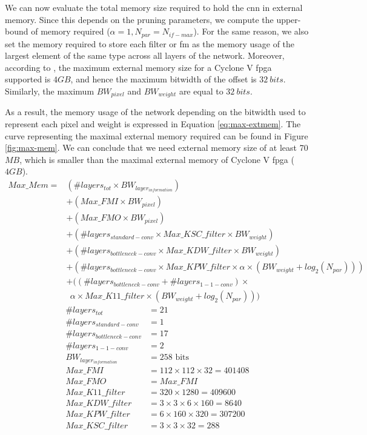 %
We can now evaluate the total memory size required to hold the \acrshort{cnn} in external memory. Since this depends on the pruning parameters, we compute the upper-bound of memory required ($\alpha = 1, N_{par} = N_{if-max}$). For the same reason, we also set the memory required to store each filter or \acrshort{fm} as the memory usage of the largest element of the same type across all layers of the network. Moreover, according to \cite{noauthor_cyclone_2018}, the maximum external memory size for a Cyclone V \acrshort{fpga} supported is $4GB$, and hence the maximum bitwidth of the offset is $32 \ bits$. Similarly, the maximum $BW_{pixel}$ and $BW_{weight}$ are equal to $32 \ bits$.

As a result, the memory usage of the network depending on the bitwidth used to represent each pixel and weight is expressed in Equation \eqref{eq:max-extmem}.
The curve representing the maximal external memory required can be found in Figure \ref{fig:max-mem}. We can conclude that we need external memory size of at least 70 $MB$, which is smaller than the maximal external memory of Cyclone V \acrshort{fpga} ($4 GB$).
%
\begin{equation}
    \begin{split}
        Max\_Mem = &\left(\# layers_{tot} \times BW_{layer_{information}} \right) \\
        &+ \left( Max\_FMI \times BW_{pixel} \right) \\
        &+ \left( Max\_FMO \times BW_{pixel} \right) \\
        &+ \left( \# layers_{standard-conv} \times Max\_KSC\_filter \times BW_{weight} \right) \\
        &+ \left( \# layers_{bottleneck-conv} \times Max\_KDW\_filter \times BW_{weight} \right)\\
        &+ \left( \# layers_{bottleneck-conv} \times Max\_KPW\_filter \times \alpha \times(BW_{weight} + log_2(N_{par})) \right)\\
        &+ ( \left(\# layers_{bottleneck-conv} + \# layers_{1-1-conv}\right) \times \\
        & \ \ \alpha \times Max\_K11\_filter \times  (BW_{weight} + log_2(N_{par})) )
    \end{split}
\label{eq:max-extmem}
\end{equation}
%
\begin{align*}
    \# layers_{tot} &= 21 \\
    \# layers_{standard-conv} &= 1 \\
    \# layers_{bottleneck-conv} &= 17 \\
    \# layers_{1-1-conv} &= 2 \\
    BW_{layer_{information}} &= 258 \text{ bits} \\
    Max\_FMI &= 112 \times 112 \times 32 = 401408 \\
    Max\_FMO &= Max\_FMI \\
    Max\_K11\_filter &= 320 \times 1280 = 409600 \\
    Max\_KDW\_filter &= 3 \times 3 \times 6 \times 160 = 8640\\
    Max\_KPW\_filter &= 6 \times 160 \times 320 = 307200 \\
    Max\_KSC\_filter &= 3 \times 3 \times 32 = 288
\end{align*}
